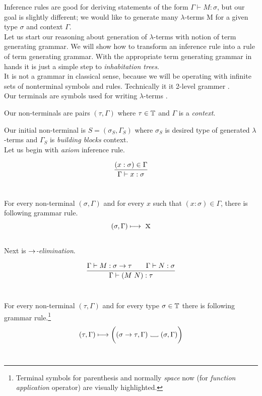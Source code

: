 \documentclass[12pt,a4paper]{report}
\newcommand{\Lets}{Let us\xspace}
\newcommand{\lterms}{$\lambda$-terms\xspace}
\newcommand{\tur}[3]{#1\vdash{}#2:#3}
\newcommand{\turst}[3]{$#1\vdash{}#2:#3$\xspace}
\newcommand{\GMS}{\turst{\Gamma}{M}{\sigma}}
\newcommand\Vtextvisiblespace[1][.3em]{%
  \mbox{\kern.06em\vrule height.3ex}%
  \vbox{\hrule width#1}%
  \hbox{\vrule height.3ex}}
\begin{document}
\newcommand{\gar}{\longmapsto}

Inference rules are good for deriving statements of the form \GMS, but our
goal is slightly different; we would like to generate many \lterms M for a given type 
$\sigma$ and context $\Gamma$.\\

\Lets start our reasoning about generation of \lterms with
notion of term generating grammar. We will show how to
transform an inference rule into a rule of term generating grammar.
With the appropriate term generating grammar 
in hands it is just a simple step to \textit{inhabitation trees}.\\

It is not a grammar in classical sense, because we will be operating with infinite sets of nonterminal symbols and rules. Technically it it
2-level grammer \cite{todo}.\\

Our terminals are symbols used for writing \lterms 
.%

Our non-terminals are pairs $(\tau,\Gamma)$ where 
$\tau \in \mathbb{T}$ and $\Gamma$ is a \textit{context}.

Our initial non-terminal is $S = (\sigma_S,\Gamma_S)$
where $\sigma_S$ is desired type of generated \lterms and
$\Gamma_S$ is \textit{building blocks} context. \\

\Lets begin with \textit{axiom} inference rule.

$$
\ruleI { (x:\sigma) \in \Gamma }
       { \tur{\Gamma}{x}{\sigma} }
$$~


For every non-terminal $(\sigma,\Gamma)$ 
and for every $x$ such that $(x:\sigma) \in \Gamma$,
there is following grammar rule.
$$ ( \sigma , \Gamma )  \longmapsto \mbox{ {\Large x}} $$ \\

Next is \textit{$\rightarrow$-elimination}.

$$
\ruleII{ \tur{\Gamma}{M}{\sigma \ar \tau} }
       { \tur{\Gamma}{N}{\sigma} }
       { \tur{\Gamma}{(M~N)}{\tau} }
$$~

For every non-terminal $(\tau,\Gamma)$ 
and for every type $\sigma \in \mathbb{T}$ 
there is following grammar rule.\footnote{ 
Terminal symbols for parenthesis and normally {\it space} 
now \textvisiblespace \quad (for {\it function application} operator) 
are visually highlighted. } 
$$
	( \tau , \Gamma )  \gar
	\bigg( ( \sigma \rightarrow \tau , \Gamma ) 
	\mbox{ \Vtextvisiblespace[1em] } ( \sigma , \Gamma ) \bigg)
$$\\
\end{document}
